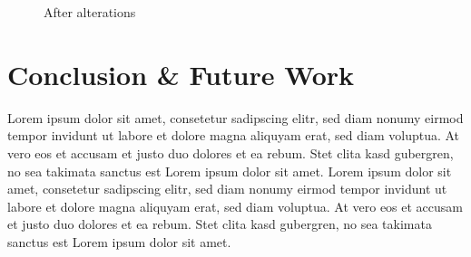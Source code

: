 \documentclass[11pt,a4paper,twoside,openright]{report}
\begin{document}
\begin{figure}[!htb]
  \caption{After alterations}\label{fig:mountainrangealteration}
\endminipage
\end{figure}

\chapter{Conclusion \& Future Work}
\label{sec:concl}

Lorem ipsum dolor sit amet, consetetur sadipscing elitr, sed diam nonumy
eirmod tempor invidunt ut labore et dolore magna aliquyam erat, sed diam voluptua. At
vero eos et accusam et justo duo dolores et ea rebum. Stet clita kasd gubergren, no sea
takimata sanctus est Lorem ipsum dolor sit amet. Lorem ipsum dolor sit amet, consetetur
sadipscing elitr, sed diam nonumy eirmod tempor invidunt ut labore et dolore magna
aliquyam erat, sed diam voluptua. At vero eos et accusam et justo duo dolores et ea
rebum. Stet clita kasd gubergren, no sea takimata sanctus est Lorem ipsum dolor sit amet.






\end{document}
